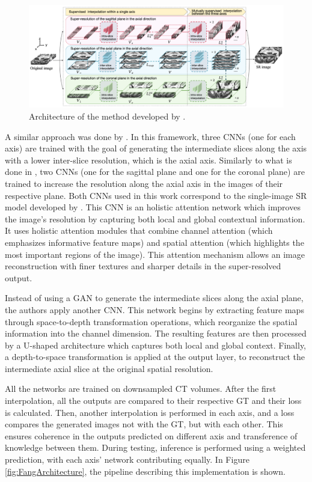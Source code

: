\begin{figure}[!ht]
	\hspace*{-0.35in}
	\includegraphics[width=1.1\linewidth]{figures/ZhangFramework.png}
	\caption{Architecture of the method developed by \textcite{Zhang2024}.}
	\label{fig:ZhangFramework}
\end{figure}

A similar approach was done by \textcite{Fang2022}. In this framework, three CNNs (one for each axis) are trained with the goal of generating the intermediate slices along the axis with a lower inter-slice resolution, which is the axial axis. Similarly to what is done in \textcite{Zhang2024}, two CNNs (one for the sagittal plane and one for the coronal plane) are trained to increase the resolution along the axial axis in the images of their respective plane. Both CNNs used in this work correspond to the single-image SR model developed by \textcite{Niu2020}. This CNN is an holistic attention network which improves the image's resolution by capturing both local and global contextual information. It uses holistic attention modules that combine channel attention (which emphasizes informative feature maps) and spatial attention (which highlights the most important regions of the image). This attention mechanism allows an image reconstruction with finer textures and sharper details in the super-resolved output.
\par
Instead of using a GAN to generate the intermediate slices along the axial plane, the authors apply another CNN. This network begins by extracting feature maps through space-to-depth transformation operations, which reorganize the spatial information into the channel dimension. The resulting features are then processed by a U-shaped architecture which captures both local and global context. Finally, a depth-to-space transformation is applied at the output layer, to reconstruct the intermediate axial slice at the original spatial resolution.
\par
All the networks are trained on downsampled CT volumes. After the first interpolation, all the outputs are compared to their respective GT and their loss is calculated. Then, another interpolation is performed in each axis, and a loss compares the generated images not with the GT, but with each other. This ensures coherence in the outputs predicted on different axis and transference of knowledge between them. During testing, inference is performed using a weighted prediction, with each axis' network contributing equally. In Figure \ref{fig:FangArchitecture}, the pipeline describing this implementation is shown.

